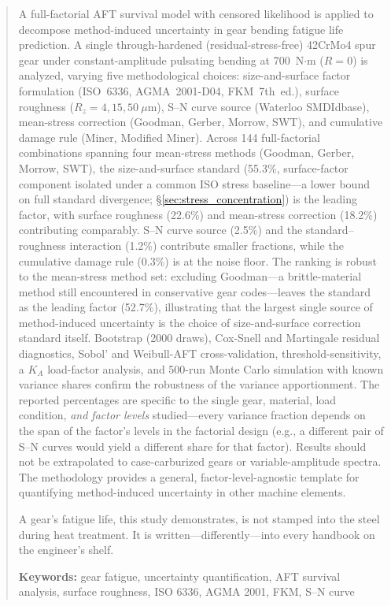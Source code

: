 \documentclass[twocolumn,12pt,a4paper]{article}
\begin{document}
\begin{abstract}
\label{sec:abstract}

A full-factorial AFT survival model with censored likelihood is
applied to decompose method-induced uncertainty in gear bending fatigue
life prediction. A single through-hardened (residual-stress-free)
42CrMo4 spur gear under constant-amplitude pulsating bending at
700~N$\cdot$m ($R=0$) is analyzed, varying five methodological choices:
size-and-surface factor formulation (ISO~6336, AGMA~2001-D04,
FKM~7th~ed.), surface roughness ($R_z=4,15,50~\mu$m), S--N curve
source (Waterloo SMDIdbase), mean-stress correction (Goodman, Gerber,
Morrow, SWT), and cumulative damage rule (Miner, Modified Miner).
Across 144 full-factorial combinations spanning four mean-stress
methods (Goodman, Gerber, Morrow, SWT), the size-and-surface standard
(55.3\%, surface-factor component isolated under a common ISO stress %
baseline---a lower bound on full standard divergence;
\S\ref{sec:stress_concentration}) is the leading factor, with
surface roughness (22.6\%) and mean-stress correction (18.2\%) %
contributing comparably. S--N curve source (2.5\%) and the %
standard--roughness interaction (1.2\%) contribute smaller fractions, %
while the cumulative damage rule (0.3\%) is at the noise floor. The %
ranking is robust to the mean-stress method
set: excluding Goodman---a brittle-material method still encountered
in conservative gear codes---leaves the standard as the leading
factor (52.7\%), illustrating that the largest single source of
method-induced uncertainty is the choice of size-and-surface
correction standard itself. Bootstrap (2000 draws), Cox-Snell and Martingale
residual diagnostics, Sobol' and Weibull-AFT cross-validation,
threshold-sensitivity, a $K_A$ load-factor analysis, and 500-run %
Monte Carlo simulation with known variance shares confirm
the robustness of the variance apportionment.
The reported percentages are specific to the single gear, material, load
condition, \emph{and factor levels} studied---every variance fraction
depends on the span of the factor's levels in the factorial design
(e.g., a different pair of S--N curves would yield a different share
for that factor). Results should not be extrapolated to case-carburized
gears or variable-amplitude spectra. The methodology provides a
general, factor-level-agnostic template for quantifying
method-induced uncertainty in other machine elements.

A gear's fatigue life, this study demonstrates, is not stamped into
the steel during heat treatment. It is written---differently---into
every handbook on the engineer's shelf.

\textbf{Keywords:} gear fatigue, uncertainty quantification, AFT survival analysis,
surface roughness, ISO 6336, AGMA 2001, FKM, S--N curve
\end{abstract}
\end{document}
